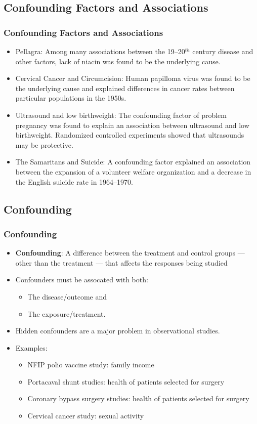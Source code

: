 \documentclass[t,xcolor=pst,dvips]{beamer}
\begin{document}
\subsection{Confounding Factors and Associations}
\begin{frame}[t]\frametitle{Confounding Factors and Associations}
{\small
\begin{itemize}
\item Pellagra:  Among many associations between the 19--20${}^{th}$ century disease and other factors, lack of niacin
  was found to be the underlying cause.
\item Cervical Cancer and Circumcision: Human papilloma virus was found to be the underlying cause
  and explained differences in cancer rates between particular populations in the 1950s.
\item Ultrasound and low birthweight:  The confounding factor of problem pregnancy was found to 
  explain an association between ultrasound and low birthweight.  Randomized controlled experiments 
  showed that ultrasounds may be protective.
\item The Samaritans and Suicide:  A confounding factor explained an association between the 
  expansion of a volunteer welfare organization and a decrease in the English suicide rate 
  in 1964--1970.
\end{itemize}
}
\end{frame}

\subsection{Confounding}
\begin{frame}[t]\frametitle{Confounding}

{\small
\begin{itemize}
\item \textbf{Confounding}:  A difference between the treatment and control groups --- other than the treatment ---
   that affects the responses being studied
\item Confounders must be assocated with both:
   \begin{itemize} 
     \item The disease/outcome and 
     \item The exposure/treatment.
   \end{itemize}
\item Hidden confounders are a major problem in observational studies.
\item Examples:
   \begin{itemize}
   \item NFIP polio vaccine study:  family income
   \item Portacaval shunt studies:  health of patients selected for surgery
   \item Coronary bypass surgery studies:  health of patients selected for surgery
   \item Cervical cancer study: sexual activity
   \end{itemize}
\end{itemize}}
\end{frame}
\end{document}
